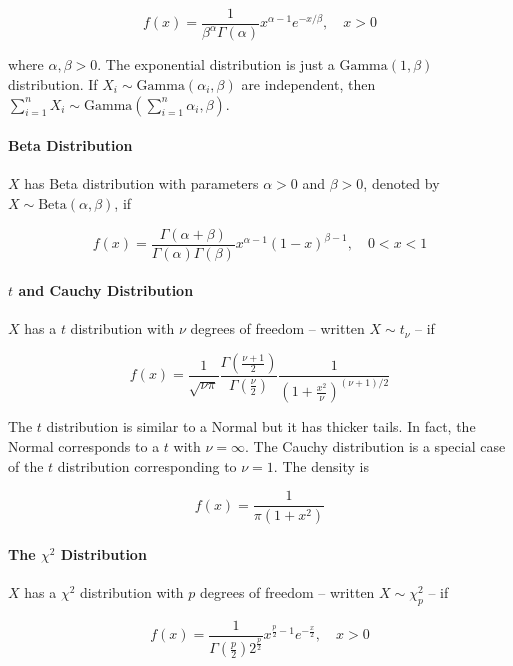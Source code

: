 \[ f(x) = \frac{1}{\beta^\alpha \Gamma(\alpha)} x^{\alpha - 1} e^{-x / \beta}, \quad x > 0 \]

where \(\alpha, \beta > 0\). The exponential distribution is just a
\(\text{Gamma}(1, \beta)\) distribution. If
\(X_i \sim \text{Gamma}(\alpha_i, \beta)\) are independent, then
\(\sum_{i=1}^n X_i \sim \text{Gamma}\left( \sum_{i=1}^n \alpha_i, \beta \right)\).

\paragraph{Beta Distribution}\label{beta-distribution}

\(X\) has Beta distribution with parameters \(\alpha > 0\) and
\(\beta > 0\), denoted by \(X \sim \text{Beta}(\alpha, \beta)\), if

\[ f(x) = \frac{\Gamma(\alpha + \beta)}{\Gamma(\alpha) \Gamma(\beta)} x^{\alpha - 1} (1 - x)^{\beta - 1}, \quad 0 < x < 1\]

\paragraph{\texorpdfstring{\(t\) and Cauchy
Distribution}{t and Cauchy Distribution}}\label{t-and-cauchy-distribution}

\(X\) has a \(t\) distribution with \(\nu\) degrees of freedom --
written \(X \sim t_\nu\) -- if

\[ f(x) = \frac{1}{\sqrt{\nu \pi}} \frac{\Gamma\left( \frac{\nu + 1}{2} \right)}{\Gamma\left( \frac{\nu}{2} \right)} \frac{1}{\left(1 + \frac{x^2}{\nu} \right)^{(\nu + 1) / 2}} \]

The \(t\) distribution is similar to a Normal but it has thicker tails.
In fact, the Normal corresponds to a \(t\) with \(\nu = \infty\). The
Cauchy distribution is a special case of the \(t\) distribution
corresponding to \(\nu = 1\). The density is

\[ f(x) = \frac{1}{\pi (1 + x^2)} \]

\paragraph{\texorpdfstring{The \(\chi^2\)
Distribution}{The \textbackslash chi\^{}2 Distribution}}\label{the-chi2-distribution}

\(X\) has a \(\chi^2\) distribution with \(p\) degrees of freedom --
written \(X \sim \chi_p^2\) -- if

\[ f(x) = \frac{1}{\Gamma\left(\frac{p}{2}\right) 2^{\frac{p}{2}}} x^{\frac{p}{2} - 1} e^{-\frac{x}{2}}, \quad x > 0 \]

